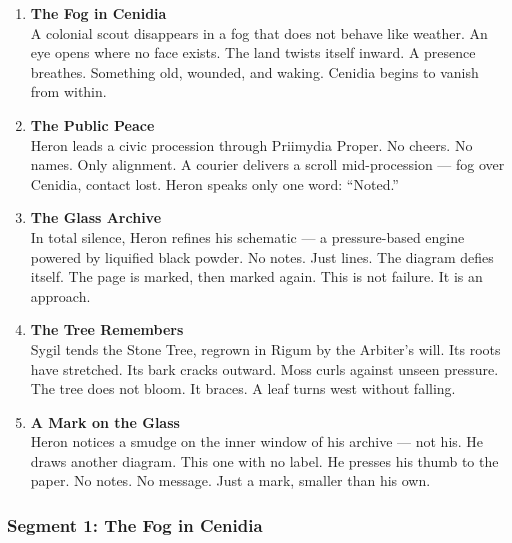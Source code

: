 \documentclass[9pt]{article}
\begin{document}
\begin{center}
\begin{enumerate}
    \item \textbf{The Fog in Cenidia} \\
    A colonial scout disappears in a fog that does not behave like weather. An eye opens where no face exists. The land twists itself inward. A presence breathes. Something old, wounded, and waking. Cenidia begins to vanish from within.

    \vspace{.3in}
    \item \textbf{The Public Peace} \\
    Heron leads a civic procession through Priimydia Proper. No cheers. No names. Only alignment. A courier delivers a scroll mid-procession — fog over Cenidia, contact lost. Heron speaks only one word: “Noted.”

    \vspace{.3in}
    \item \textbf{The Glass Archive} \\
    In total silence, Heron refines his schematic — a pressure-based engine powered by liquified black powder. No notes. Just lines. The diagram defies itself. The page is marked, then marked again. This is not failure. It is an approach.

    \vspace{.3in}
    \item \textbf{The Tree Remembers} \\
    Sygil tends the Stone Tree, regrown in Rigum by the Arbiter’s will. Its roots have stretched. Its bark cracks outward. Moss curls against unseen pressure. The tree does not bloom. It braces. A leaf turns west without falling.

    \vspace{.3in}
    \item \textbf{A Mark on the Glass} \\
    Heron notices a smudge on the inner window of his archive — not his. He draws another diagram. This one with no label. He presses his thumb to the paper. No notes. No message. Just a mark, smaller than his own.
\end{enumerate}
\end{center}

\newpage

\subsubsection*{Segment 1: The Fog in Cenidia}
\end{document}
